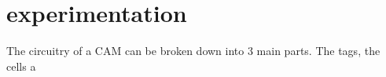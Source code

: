 \section{experimentation}
The circuitry of a CAM can be broken down into 3 main parts. The tags, the cells a
